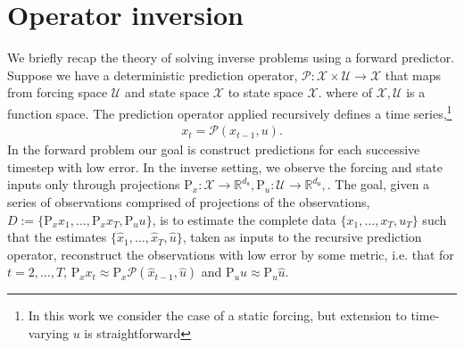 \documentclass{article}
\newcommand{\mm}[1]{\mathrm{#1}}
\newcommand{\rv}[1]{\mathsf{#1}}
\newcommand{\set}[1]{#1}
\newcommand{\op}[1]{\mathscr{#1}}
\newcommand{\seenstate}[1]{\mm{P}_{x}{#1}}
\newcommand{\seeninp}[1]{\mm{P}_{u}{#1}}
\newcommand{\inp}{\rv{u}}
\newcommand{\inpst}{u}
\newcommand{\inpsp}{\mathcal{U}}
\newcommand{\state}{\rv{x}}
\newcommand{\statest}{x}
\newcommand{\statesp}{\mathcal{X}}
\begin{document}
\listoftodos

\section{Operator inversion}

We briefly recap the theory of solving inverse problems using a forward predictor.
Suppose we have a deterministic prediction operator,
\(\op{P}:\statesp\times  \inpsp \to \statesp\) that maps from forcing space \( \inpsp\) and state space \(\statesp\) to state space \(\statesp\). where of \(\statesp,\inpsp\) is a function space.
The prediction operator applied recursively defines a time series,\footnote{In this work we consider the case of a static forcing, but extension to time-varying \(\inpst\) is straightforward}
\begin{align*}
    \statest_{t}=\op{P}(\statest_{t-1}, \inpst).
\end{align*}
In the forward problem our goal is construct predictions for each successive timestep with low error.
In the inverse setting, we observe the forcing and state inputs only through projections \(\seenstate{}: \statesp \to \mathbb{R}^{d_\state},\seeninp{}: \inpsp \to \mathbb{R}^{d_\inp},\).
The goal, given a series of observations comprised of projections of the observations, \(\set{D}:=\{\seenstate{\statest}_{1},\dots, \seenstate{\statest}_{T},\seeninp{\inpst}\}\), is to estimate the complete data
\(\{\statest_{1},\dots, \statest_{T},\inpst_{T}\}\)
such that the estimates \(\{\hat{\statest}_{1},\dots,\hat{\statest}_{T},\hat{\inpst}\}\), taken as inputs to the recursive prediction operator, reconstruct the observations with low error by some metric, i.e. that for \(t=2,\dots,T\),
\(\seenstate{\statest}_{t}\approx\seenstate{\op{P}}\left(\hat{\statest}_{t-1}, \hat{\inpst}\right)\) and \(\seeninp{\inpst}\approx\seeninp{\hat{\inpst}}\).
\end{document}
